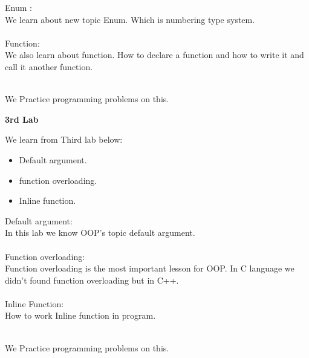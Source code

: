 \documentclass[12pt]{article}
\begin{document}
             Enum : \\ 
             We learn about new topic Enum. Which is numbering type system. \\ \\
              Function:\\ 
              We also learn about function. How to declare a function and how to write it and call it another function. \\ \\ 
              \begin{large}
               We Practice programming problems on this. \\
                \end{large}
                 \newpage
                  \begin{center}
                   \textbf{3rd Lab} 
                   \end{center} We learn from Third lab below: 
                   \begin{itemize}
                    \item Default argument.
                     \item function overloading. \item Inline function.
                      \end{itemize}
                       Default argument: \\ 
                       In this lab we know OOP's topic default argument.\\ \\ 
                       Function overloading:\\
                        Function overloading is the most important lesson for OOP. In C language we didn't found function overloading but in C++.\\ \\
                         Inline Function:\\
                          How to work Inline function in program.\\ \\
                           \begin{large} We Practice programming problems on this. \\ 
                           \end{large}\\ \\ \\ \\ \\ 
\end{document}
